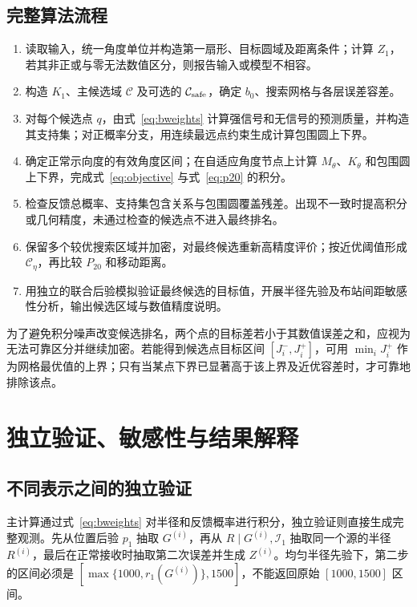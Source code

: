 \documentclass[UTF8,a4paper,zihao=-4,fontset=none]{ctexart}
\numberwithin{equation}{section}
\theoremstyle{definition}
\begin{document}
\subsection{完整算法流程}
\begin{enumerate}[label=步骤\arabic*：]
\item 读取输入，统一角度单位并构造第一扇形、目标圆域及距离条件；计算 \(Z_1\)，若其非正或与零无法数值区分，则报告输入或模型不相容。
\item 构造 \(K_1\)、主候选域 \(\mathcal C\) 及可选的 \(\mathcal C_{\rm safe}\)，确定 \(b_0\)、搜索网格与各层误差容差。
\item 对每个候选点 \(q\)，由式~\eqref{eq:bweights} 计算强信号和无信号的预测质量，并构造其支持集；对正概率分支，用连续最远点约束生成计算包围圆上下界。
\item 确定正常示向度的有效角度区间；在自适应角度节点上计算 \(M_\theta\)、\(K_\theta\) 和包围圆上下界，完成式~\eqref{eq:objective} 与式~\eqref{eq:p20} 的积分。
\item 检查反馈总概率、支持集包含关系与包围圆覆盖残差。出现不一致时提高积分或几何精度，未通过检查的候选点不进入最终排名。
\item 保留多个较优搜索区域并加密，对最终候选重新高精度评价；按近优阈值形成 \(\mathcal C_\eta\)，再比较 \(P_{20}\) 和移动距离。
\item 用独立的联合后验模拟验证最终候选的目标值，开展半径先验及布站间距敏感性分析，输出候选区域与数值精度说明。
\end{enumerate}

为了避免积分噪声改变候选排名，两个点的目标差若小于其数值误差之和，应视为无法可靠区分并继续加密。若能得到候选点目标区间 \([J_i^-,J_i^+]\)，可用 \(\min_iJ_i^+\) 作为网格最优值的上界；只有当某点下界已显著高于该上界及近优容差时，才可靠地排除该点。

\section{独立验证、敏感性与结果解释}
\subsection{不同表示之间的独立验证}
主计算通过式~\eqref{eq:bweights} 对半径和反馈概率进行积分，独立验证则直接生成完整观测。先从位置后验 \(p_1\) 抽取 \(G^{(i)}\)，再从 \(R\mid G^{(i)},\mathcal I_1\) 抽取同一个源的半径 \(R^{(i)}\)，最后在正常接收时抽取第二次误差并生成 \(Z^{(i)}\)。均匀半径先验下，第二步的区间必须是 \([\max\{1000,r_1(G^{(i)})\},1500]\)，不能返回原始 \([1000,1500]\) 区间。
\end{document}
